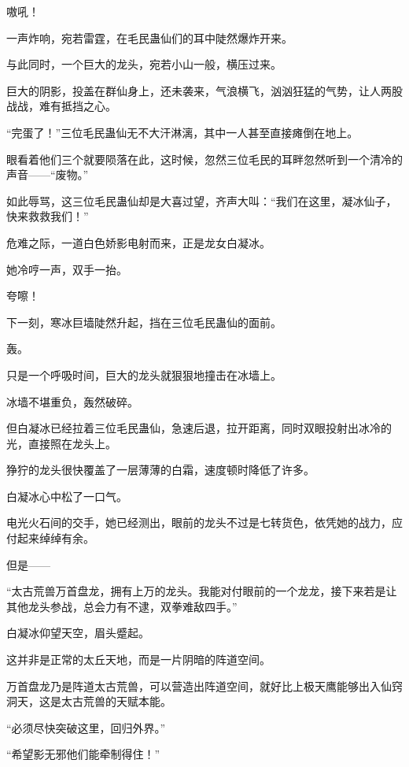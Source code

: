 
\begin{this_body}



嗷吼！

一声炸响，宛若雷霆，在毛民蛊仙们的耳中陡然爆炸开来。

与此同时，一个巨大的龙头，宛若小山一般，横压过来。

巨大的阴影，投盖在群仙身上，还未袭来，气浪横飞，汹汹狂猛的气势，让人两股战战，难有抵挡之心。

“完蛋了！”三位毛民蛊仙无不大汗淋漓，其中一人甚至直接瘫倒在地上。

眼看着他们三个就要陨落在此，这时候，忽然三位毛民的耳畔忽然听到一个清冷的声音——“废物。”

如此辱骂，这三位毛民蛊仙却是大喜过望，齐声大叫：“我们在这里，凝冰仙子，快来救救我们！”

危难之际，一道白色娇影电射而来，正是龙女白凝冰。

她冷哼一声，双手一抬。

夸嚓！

下一刻，寒冰巨墙陡然升起，挡在三位毛民蛊仙的面前。

轰。

只是一个呼吸时间，巨大的龙头就狠狠地撞击在冰墙上。

冰墙不堪重负，轰然破碎。

但白凝冰已经拉着三位毛民蛊仙，急速后退，拉开距离，同时双眼投射出冰冷的光，直接照在龙头上。

狰狞的龙头很快覆盖了一层薄薄的白霜，速度顿时降低了许多。

白凝冰心中松了一口气。

电光火石间的交手，她已经测出，眼前的龙头不过是七转货色，依凭她的战力，应付起来绰绰有余。

但是——

“太古荒兽万首盘龙，拥有上万的龙头。我能对付眼前的一个龙龙，接下来若是让其他龙头参战，总会力有不逮，双拳难敌四手。”

白凝冰仰望天空，眉头蹙起。

这并非是正常的太丘天地，而是一片阴暗的阵道空间。

万首盘龙乃是阵道太古荒兽，可以营造出阵道空间，就好比上极天鹰能够出入仙窍洞天，这是太古荒兽的天赋本能。

“必须尽快突破这里，回归外界。”

“希望影无邪他们能牵制得住！”


\end{this_body}
